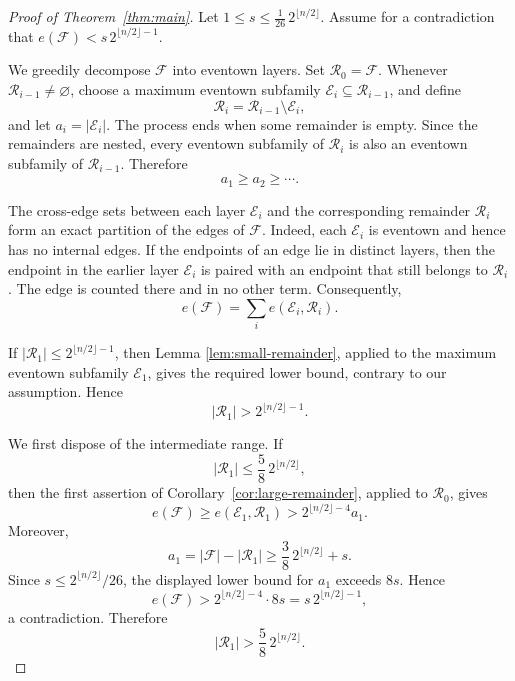\documentclass[11pt]{article}
\begin{document}
\begin{proof}[Proof of Theorem~\ref{thm:main}]
Let \(1\le s\le \frac{1}{26}\,2^{\lfloor n/2\rfloor}\). Assume for a contradiction that \(e(\mathcal F)<s\,2^{\lfloor n/2\rfloor-1}\).

We greedily decompose \(\mathcal F\) into eventown layers.  Set
\(\mathcal R_0=\mathcal F\).  Whenever \(\mathcal R_{i-1}\ne\varnothing\),
choose a maximum eventown subfamily
\(\mathcal E_i\subseteq\mathcal R_{i-1}\), and define
\[
 \mathcal R_i=\mathcal R_{i-1}\setminus\mathcal E_i,
\]
and let \(a_i=|\mathcal E_i|\).
The process ends when some remainder is empty.  Since the remainders are
nested, every eventown subfamily of \(\mathcal R_i\) is also an eventown
subfamily of \(\mathcal R_{i-1}\).  Therefore
\begin{equation}
 a_1\ge a_2\ge\cdots.
\label{eq:layer-monotonicity}
\end{equation}

The cross-edge sets between each layer \(\mathcal E_i\) and the corresponding
remainder \(\mathcal R_i\) form an exact partition of the edges of
\(\mathcal F\).  Indeed, each \(\mathcal E_i\) is eventown and hence has
no internal edges.  If the endpoints of an edge lie in distinct layers, then
the endpoint in the earlier layer \(\mathcal E_i\) is paired with an endpoint
that still belongs to \(\mathcal R_i\).  The edge is counted there and in no
other term.  Consequently,
\begin{equation}
 e(\mathcal F)
 =
 \sum_i e(\mathcal E_i,\mathcal R_i).
\label{eq:edge-partition}
\end{equation}

If
\(|\mathcal R_1|\le2^{\lfloor n/2\rfloor-1}\), then Lemma
\ref{lem:small-remainder}, applied to the maximum eventown subfamily
\(\mathcal E_1\), gives the required lower bound, contrary to our
assumption.  Hence
\begin{equation}
 |\mathcal R_1|>2^{\lfloor n/2\rfloor-1}.
\label{eq:first-remainder-large}
\end{equation}

We first dispose of the intermediate range.  If
\[
 |\mathcal R_1|\le \frac58\,2^{\lfloor n/2\rfloor},
\]
then the first assertion of Corollary~\ref{cor:large-remainder}, applied to
\(\mathcal R_0\), gives
\[
 e(\mathcal F)
 \ge e(\mathcal E_1,\mathcal R_1)
 >2^{\lfloor n/2\rfloor-4}a_1.
\]
Moreover,
\[
 a_1=|\mathcal F|-|\mathcal R_1|
 \ge \frac38\,2^{\lfloor n/2\rfloor}+s.
\]
Since \(s\le 2^{\lfloor n/2\rfloor}/26\), the displayed lower bound for
\(a_1\) exceeds \(8s\).  Hence
\[
 e(\mathcal F)>2^{\lfloor n/2\rfloor-4}\cdot8s
 =s\,2^{\lfloor n/2\rfloor-1},
\]
a contradiction.  Therefore
\begin{equation}
 |\mathcal R_1|>\frac58\,2^{\lfloor n/2\rfloor}.
\label{eq:first-remainder-very-large}
\end{equation}


\end{proof}
\end{document}
